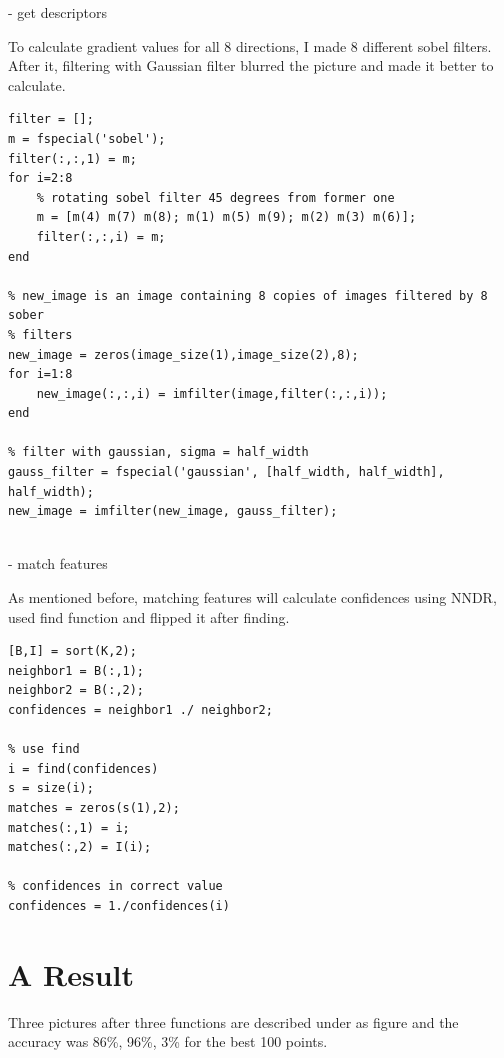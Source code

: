 - get descriptors


To calculate gradient values for all 8 directions, I made 8 different sobel filters. After it, filtering with Gaussian filter blurred the picture and made it better to calculate.

\begin{lstlisting}[style=Matlab-editor]
% Use sobel filter to rotate image in certain direction and calculate gradient  
filter = [];
m = fspecial('sobel'); 
filter(:,:,1) = m;
for i=2:8 
    % rotating sobel filter 45 degrees from former one
    m = [m(4) m(7) m(8); m(1) m(5) m(9); m(2) m(3) m(6)];
    filter(:,:,i) = m;
end

% new_image is an image containing 8 copies of images filtered by 8 sober
% filters
new_image = zeros(image_size(1),image_size(2),8); 
for i=1:8 
    new_image(:,:,i) = imfilter(image,filter(:,:,i)); 
end

% filter with gaussian, sigma = half_width
gauss_filter = fspecial('gaussian', [half_width, half_width], half_width);
new_image = imfilter(new_image, gauss_filter);


\end{lstlisting}

- match features

As mentioned before, matching features will calculate confidences using NNDR, used find function and flipped it after finding. 

\begin{lstlisting}[style=Matlab-editor]
% confidences > 1
[B,I] = sort(K,2);
neighbor1 = B(:,1);
neighbor2 = B(:,2);
confidences = neighbor1 ./ neighbor2;

% use find
i = find(confidences)
s = size(i);
matches = zeros(s(1),2);
matches(:,1) = i; 
matches(:,2) = I(i);

% confidences in correct value
confidences = 1./confidences(i)

\end{lstlisting}


\section*{A Result}

Three pictures after three functions are described under as figure \label{fig:result1} and the accuracy was 86\%, 96\%, 3\% for the best 100 points.

